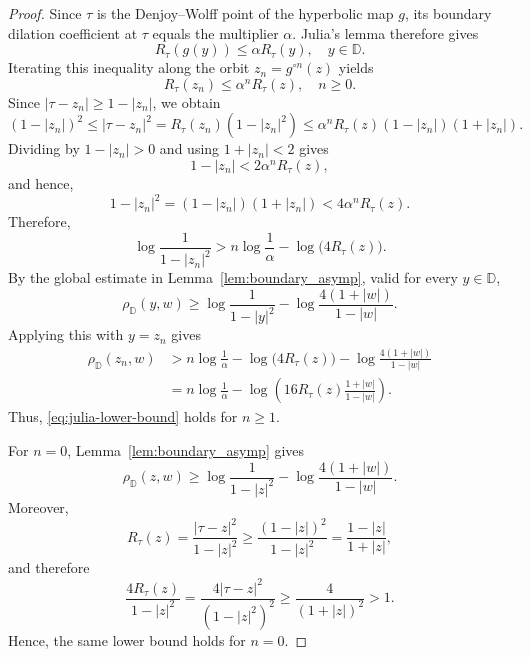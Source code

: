 \documentclass[10pt,a4paper]{amsart}
\numberwithin{equation}{section}
\begin{document}
\begin{proof}
Since $\tau$ is the Denjoy--Wolff point of the hyperbolic map $g$,
its boundary dilation coefficient at $\tau$ equals the multiplier
$\alpha$. Julia's lemma therefore gives
\begin{equation*}
R_\tau(g(y))\leq \alpha R_\tau(y),
\quad y\in\mathbb{D}.
\end{equation*}
Iterating this inequality along the orbit
$z_n=g^{\circ n}(z)$ yields
\begin{equation*}
R_\tau(z_n)\leq \alpha^n R_\tau(z),
\quad n\geq0.
\end{equation*}
Since $|\tau-z_n|\geq1-|z_n|$, we obtain
\begin{equation*}
(1-|z_n|)^2
\leq |\tau-z_n|^2
=R_\tau(z_n)(1-|z_n|^2)
\leq \alpha^nR_\tau(z)(1-|z_n|)(1+|z_n|).
\end{equation*}
Dividing by $1-|z_n|>0$ and using $1+|z_n|<2$ gives
\begin{equation*}
1-|z_n|<2\alpha^nR_\tau(z),
\end{equation*}
and hence,
\begin{equation*}
1-|z_n|^2
=
(1-|z_n|)(1+|z_n|)
<
4\alpha^nR_\tau(z).
\end{equation*}
Therefore,
\begin{equation*}
\log\frac{1}{1-|z_n|^2}
>
n\log\frac{1}{\alpha}
-
\log\bigl(4R_\tau(z)\bigr).
\end{equation*}
By the global estimate in
Lemma~\ref{lem:boundary_asymp}, valid for every $y\in\mathbb{D}$,
\begin{equation*}
\rho_{\mathbb{D}}(y,w)
\geq
\log\frac{1}{1-|y|^2}
-
\log\frac{4(1+|w|)}{1-|w|}.
\end{equation*}
Applying this with $y=z_n$ gives
\begin{align*}
\rho_{\mathbb{D}}(z_n,w)
&>
n\log\frac{1}{\alpha}
-\log\bigl(4R_\tau(z)\bigr)
-\log\frac{4(1+|w|)}{1-|w|}\\
&=
n\log\frac{1}{\alpha}
-
\log\left(
16R_\tau(z)\frac{1+|w|}{1-|w|}
\right).
\end{align*}
Thus, \eqref{eq:julia-lower-bound} holds for $n\geq1$.

For $n=0$, Lemma~\ref{lem:boundary_asymp} gives
\begin{equation*}
\rho_{\mathbb{D}}(z,w)
\geq
\log\frac{1}{1-|z|^2}
-
\log\frac{4(1+|w|)}{1-|w|}.
\end{equation*}
Moreover,
\begin{equation*}
R_\tau(z)
=
\frac{|\tau-z|^2}{1-|z|^2}
\geq
\frac{(1-|z|)^2}{1-|z|^2}
=
\frac{1-|z|}{1+|z|},
\end{equation*}
and therefore
\begin{equation*}
\frac{4R_\tau(z)}{1-|z|^2}
=
\frac{4|\tau-z|^2}{(1-|z|^2)^2}
\geq
\frac{4}{(1+|z|)^2}
>1.
\end{equation*}
Hence, the same lower bound holds for $n=0$.
\end{proof}
\end{document}
